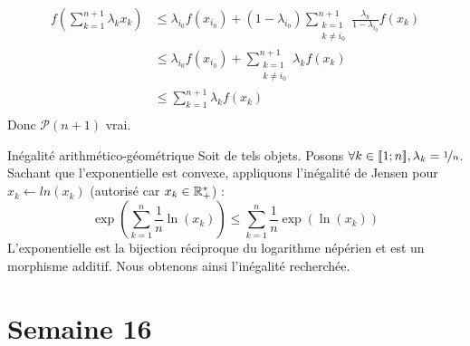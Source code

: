 \documentclass{article}
\renewenvironment{question_kholle}[2][ ]
{
	\subsection{\texorpdfstring{#2}{}}
	\notblank{#1}
	{
		\noindent #1
		\bigbreak
	}
	{}
	\begin{proof}
}
{
	\end{proof}
}
\begin{document}
\begin{question_kholle}
\begin{itemize}[label=*, leftmargin=0.5cm]
		      \begin{equation*}
			      \begin{aligned}
				      f\left( \sum_{k=1}^{n+1} \lambda_k x_k \right)
				       & \leqslant \lambda_{i_0} f(x_{i_0}) + \left( 1 - \lambda_{i_0} \right) \sum_{\begin{array}{c} k = 1 \\ k \neq i_0 \end{array}}^{n+1} \frac{\lambda_k}{1 - \lambda_{i_0}} f\left( x_k \right) \\
				       & \leqslant \lambda_{i_0} f(x_{i_0}) + \sum_{\begin{array}{c} k = 1 \\ k \neq i_0 \end{array}}^{n+1} \lambda_k f\left( x_k \right)                                                            \\
				       & \leqslant \sum_{k = 1}^{n+1} \lambda_k f\left( x_k \right)                                                                                                                                  \\
			      \end{aligned}
		      \end{equation*}
		      Donc $\mathcal{P}(n+1)$ vrai.
	\end{itemize}
\end{question_kholle}

\begin{question_kholle}
	[Soit $n \in \N^*$. Soit $x \in \R_+^{*n}$.
		\begin{equation}
			\left( \prod_{k=1}^{n} x_k \right)^{\nicefrac{1}{n}}
			\leqslant \frac{1}{n} \sum_{k=1}^{n} x_k
		\end{equation}]
	{Inégalité arithmético-géométrique}
	Soit de tels objets. Posons $\forall k \in [\![1;n]\!], \lambda_k = \nicefrac{1}{n}$. \\
	Sachant que l'exponentielle est convexe, appliquons l'inégalité de Jensen pour $x_k \leftarrow ln(x_k)$ (autorisé car $x_k \in \mathbb R_+^*$) :
	\begin{equation*}
		\exp \left( \sum_{k=1}^{n} \frac{1}{n} \ln \left( x_k \right) \right)
		\leqslant \sum_{k=1}^{n} \frac{1}{n} \exp \left( \ln \left( x_k \right) \right)
	\end{equation*}
	L'exponentielle est la bijection réciproque du logarithme népérien et est un morphisme additif. Nous obtenons ainsi l'inégalité recherchée.
\end{question_kholle}
\pagebreak\section{Semaine 16}
\end{document}

